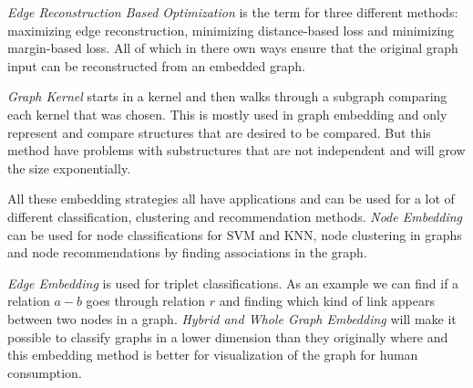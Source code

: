 \textit{Edge Reconstruction Based Optimization} is the term for three different methods: maximizing edge reconstruction, minimizing distance-based loss and minimizing margin-based loss. All of which in there own ways ensure that the original graph input can be reconstructed from an embedded graph\cite{8294302}.

\textit{Graph Kernel} starts in a kernel and then walks through a subgraph comparing each kernel that was chosen. This is mostly used in graph embedding and only represent and compare structures that are desired to be compared. But this method have problems with substructures that are not independent and will grow the size exponentially\cite{8294302}.

All these embedding strategies all have applications and can be used for a lot of different classification, clustering and recommendation methods. \textit{Node Embedding} can be used for node classifications for SVM and KNN, node clustering in graphs and node recommendations by finding associations in the graph\cite{8294302}.

\textit{Edge Embedding} is used for triplet classifications. As an example we can find if a relation $a-b$ goes through relation $r$ and finding which kind of link appears between two nodes in a graph. \textit{Hybrid and Whole Graph Embedding} will make it possible to classify graphs in a lower dimension than they originally where and this embedding method is better for visualization of the graph for human consumption\cite{8294302}.
